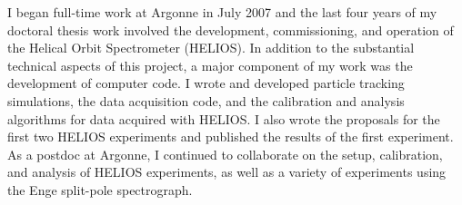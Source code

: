 {I began full-time work at Argonne in July 2007 and the last four years of my doctoral thesis work involved the
 development, commissioning, and operation of the Helical Orbit Spectrometer (HELIOS).
In addition to the substantial technical aspects of this project,
 a major component of my work was the development of computer code. %
I wrote and developed particle tracking simulations, %
 the data acquisition code, and %
 the calibration and analysis algorithms for data acquired with HELIOS. 
 I also wrote the proposals for the first two HELIOS experiments and published the results of the first experiment.
As a postdoc at Argonne, 
 I continued to collaborate on %
the setup, calibration, and analysis of HELIOS experiments, as well as %
 a variety of experiments using the Enge split-pole spectrograph.%

}
